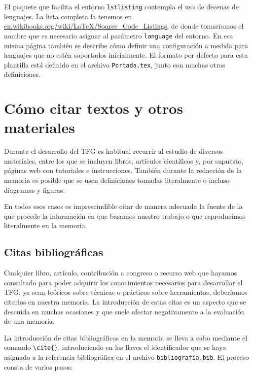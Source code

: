 El paquete que facilita el entorno \verb|lstlisting| contempla el uso de decenas de lenguajes. La lista completa la tenemos en \url{en.wikibooks.org/wiki/LaTeX/Source_Code_Listings}, de donde tomaríamos el nombre que es necesario asignar al parámetro \texttt{language} del entorno. En esa misma página también se describe cómo definir una configuración a medida para lenguajes que no estén soportados inicialmente. El formato por defecto para esta plantilla está definido en el archivo \texttt{Portada.tex}, junto con muchas otras definiciones.

\section{Cómo citar textos y otros materiales}

Durante el desarrollo del TFG es habitual recurrir al estudio de diversos materiales, entre los que se incluyen libros, artículos científicos y, por supuesto, páginas web con tutoriales e instrucciones. También durante la redacción de la memoria es posible que se usen definiciones tomadas literalmente o incluso diagramas y figuras.

En todos esos casos es imprescindible citar de manera adecuada la fuente de la que procede la información en que basamos nuestro trabajo o que reproducimos literalmente en la memoria.

\subsection{Citas bibliográficas}

Cualquier libro, artículo, contribución a congreso o recurso web que hayamos consultado para poder adquirir los conocimientos necesarios para desarrollar el TFG, ya sean teóricos sobre técnicas o prácticos sobre herramientas, deberíamos citarlos en nuestra memoria. La introducción de estas citas es un aspecto que se descuida en muchas ocasiones y que suele afectar negativamente a la evaluación de una memoria.

La introducción de citas bibliográficas en la memoria se lleva a cabo mediante el comando \verb|\cite{}|, introduciendo en las llaves el identificador que se haya asignado a la referencia bibliográfica en el archivo \texttt{bibliografía.bib}. El proceso consta de varios pasos:

